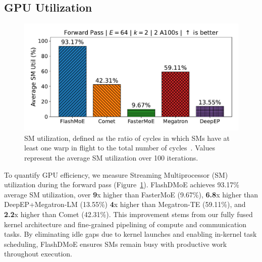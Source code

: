\subsection{GPU Utilization}\label{subsec:gpu-utilization}
\begin{figure}
    \vspace{-10pt}
    \centering
    \includegraphics[width=0.9\linewidth, keepaspectratio]{flash_figs/sm_util}
    \caption{SM utilization, defined as the ratio of cycles in which SMs
    have at least one warp in flight
    to the total number of cycles~\cite{nsight-metrics}.
    Values represent the average SM utilization over 100 iterations.}
    \label{fig:smu}
\end{figure}
To quantify GPU efficiency, we measure Streaming Multiprocessor (SM) utilization during the forward pass (Figure~\ref{fig:smu}).
FlashDMoE achieves 93.17\% average SM utilization,
over \textbf{9}x higher than FasterMoE (9.67\%), \textbf{6.8}x higher than DeepEP+Megatron-LM (13.55\%)
\textbf{4}x higher than Megatron-TE (59.11\%), and
\textbf{2.2}x higher than Comet (42.31\%).
This improvement stems from our fully fused kernel architecture and
fine-grained pipelining of compute and communication tasks.
By eliminating idle gaps due to kernel launches and enabling in-kernel task scheduling,
FlashDMoE ensures SMs remain busy with productive work throughout execution.

